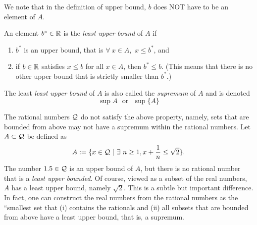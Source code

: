 \begin{rem}
We note that in the definition of upper bound,  $b$ does NOT have to be an element of $A$.
\end{rem}

\begin{definition}
An element $b^*\in \mathbb R$ is the \emph{least upper bound} of $A$ if
\begin{enumerate}
\renewcommand{\labelenumi}{(\alph{enumi})}
\setlength{\itemsep}{.2cm}
\item $b^*$ is an upper bound, that is $\forall ~x\in A$,~$x \le b^*$, and
\item  if $b\in \mathbb R$ satisfies $ x \le b$ for all $x\in A$, then $b^* \le b$. (This means that there is no other upper bound that is strictly smaller than $b^\ast$.)
\end{enumerate}
\end{definition}

\begin{notvocab}
The least \emph{least upper bound} of $A$ is also called the \emph{supremum} of $A$ and is denoted
$$\sup A~~~\mbox{or}~~~\sup\{A\}$$
\end{notvocab} 


\begin{center}

    
\end{center}
\vspace*{.5cm} 

\begin{rem}
The rational numbers ${\cal Q}$ do not satisfy the above property, namely, sets that are bounded from above may not have a supremum within the rational numbers. Let $A \subset {\cal Q}$ be defined as
$$A:=\{ x \in {\cal Q}~|~ \exists~ n \ge 1, x + \frac{1}{n} \le \sqrt{2} \}.$$
The number $1.5 \in {\cal Q} $ is an upper bound of $A$, but there is no rational number that is a \emph{least upper bounded}. Of course, viewed as a subset of the real numbers, $A$ has a least upper bound, namely $\sqrt{2}$. This is a subtle but important difference. In fact, one can construct the real numbers from the rational numbers as the ``smallest set that (i) contains the rationals and (ii) all subsets that are bounded from above have a least upper bound, that is, a supremum. 

\end{rem} 


